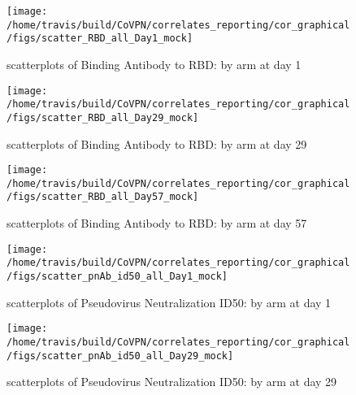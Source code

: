 \documentclass[]{book}
\theoremstyle{definition}
\theoremstyle{definition}
\theoremstyle{definition}
\newcommand{\1}{\mathbbm{1}}
\begin{document}
\clearpage
\begin{figure}[H]

{\centering \texttt{[image: /home/travis/build/CoVPN/correlates\_reporting/cor\_graphical/figs/scatter\_RBD\_all\_Day1\_mock]} 

}

\caption{scatterplots of Binding Antibody to RBD: by arm at day 1}\label{fig:unnamed-chunk-266}
\end{figure}

\clearpage
\begin{figure}[H]

{\centering \texttt{[image: /home/travis/build/CoVPN/correlates\_reporting/cor\_graphical/figs/scatter\_RBD\_all\_Day29\_mock]} 

}

\caption{scatterplots of Binding Antibody to RBD: by arm at day 29}\label{fig:unnamed-chunk-267}
\end{figure}

\clearpage
\begin{figure}[H]

{\centering \texttt{[image: /home/travis/build/CoVPN/correlates\_reporting/cor\_graphical/figs/scatter\_RBD\_all\_Day57\_mock]} 

}

\caption{scatterplots of Binding Antibody to RBD: by arm at day 57}\label{fig:unnamed-chunk-268}
\end{figure}

\clearpage
\begin{figure}[H]

{\centering \texttt{[image: /home/travis/build/CoVPN/correlates\_reporting/cor\_graphical/figs/scatter\_pnAb\_id50\_all\_Day1\_mock]} 

}

\caption{scatterplots of Pseudovirus Neutralization ID50: by arm at day 1}\label{fig:unnamed-chunk-269}
\end{figure}

\clearpage
\begin{figure}[H]

{\centering \texttt{[image: /home/travis/build/CoVPN/correlates\_reporting/cor\_graphical/figs/scatter\_pnAb\_id50\_all\_Day29\_mock]} 

}

\caption{scatterplots of Pseudovirus Neutralization ID50: by arm at day 29}\label{fig:unnamed-chunk-270}
\end{figure}
\end{document}
